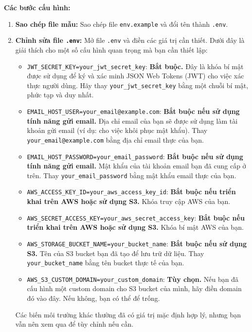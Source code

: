 \textbf{Các bước cấu hình:}
\begin{enumerate}
    \item \textbf{Sao chép file mẫu:} Sao chép file \texttt{env.example} và đổi tên thành \texttt{.env}.
    \item \textbf{Chỉnh sửa file \texttt{.env}:} Mở file \texttt{.env} và điền các giá trị cần thiết. Dưới đây là giải thích cho một số cấu hình quan trọng mà bạn cần thiết lập:
    \begin{itemize}
        \item \texttt{JWT\_SECRET\_KEY=your\_jwt\_secret\_key}: \textbf{Bắt buộc.} Đây là khóa bí mật được sử dụng để ký và xác minh JSON Web Tokens (JWT) cho việc xác thực người dùng. Hãy thay \texttt{your\_jwt\_secret\_key} bằng một chuỗi bí mật, phức tạp và duy nhất.
        \item \texttt{EMAIL\_HOST\_USER=your\_email@example.com}: \textbf{Bắt buộc nếu sử dụng tính năng gửi email.} Địa chỉ email của bạn sẽ được sử dụng làm tài khoản gửi email (ví dụ: cho việc khôi phục mật khẩu). Thay \texttt{your\_email@example.com} bằng địa chỉ email thực của bạn.
        \item \texttt{EMAIL\_HOST\_PASSWORD=your\_email\_password}: \textbf{Bắt buộc nếu sử dụng tính năng gửi email.} Mật khẩu của tài khoản email bạn đã cung cấp ở trên. Thay \texttt{your\_email\_password} bằng mật khẩu email thực của bạn.
        \item \texttt{AWS\_ACCESS\_KEY\_ID=your\_aws\_access\_key\_id}: \textbf{Bắt buộc nếu triển khai trên AWS hoặc sử dụng S3.} Khóa truy cập AWS của bạn.
        \item \texttt{AWS\_SECRET\_ACCESS\_KEY=your\_aws\_secret\_access\_key}: \textbf{Bắt buộc nếu triển khai trên AWS hoặc sử dụng S3.} Khóa bí mật AWS của bạn.
        \item \texttt{AWS\_STORAGE\_BUCKET\_NAME=your\_bucket\_name}: \textbf{Bắt buộc nếu sử dụng S3.} Tên của S3 bucket bạn đã tạo để lưu trữ dữ liệu. Thay \texttt{your\_bucket\_name} bằng tên bucket thực tế của bạn.
        \item \texttt{AWS\_S3\_CUSTOM\_DOMAIN=your\_custom\_domain}: \textbf{Tùy chọn.} Nếu bạn đã cấu hình một custom domain cho S3 bucket của mình, hãy điền domain đó vào đây. Nếu không, bạn có thể để trống.
    \end{itemize}
    Các biến môi trường khác thường đã có giá trị mặc định hợp lý, nhưng bạn vẫn nên xem qua để tùy chỉnh nếu cần.
\end{enumerate}


